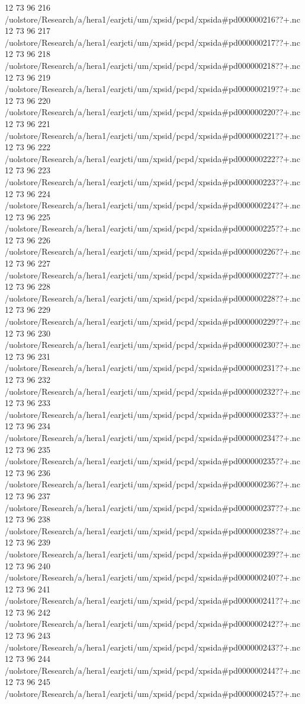 12 73 96
216
/uolstore/Research/a/hera1/earjcti/um/xpsid/pcpd/xpsida#pd000000216??+.nc
12 73 96
217
/uolstore/Research/a/hera1/earjcti/um/xpsid/pcpd/xpsida#pd000000217??+.nc
12 73 96
218
/uolstore/Research/a/hera1/earjcti/um/xpsid/pcpd/xpsida#pd000000218??+.nc
12 73 96
219
/uolstore/Research/a/hera1/earjcti/um/xpsid/pcpd/xpsida#pd000000219??+.nc
12 73 96
220
/uolstore/Research/a/hera1/earjcti/um/xpsid/pcpd/xpsida#pd000000220??+.nc
12 73 96
221
/uolstore/Research/a/hera1/earjcti/um/xpsid/pcpd/xpsida#pd000000221??+.nc
12 73 96
222
/uolstore/Research/a/hera1/earjcti/um/xpsid/pcpd/xpsida#pd000000222??+.nc
12 73 96
223
/uolstore/Research/a/hera1/earjcti/um/xpsid/pcpd/xpsida#pd000000223??+.nc
12 73 96
224
/uolstore/Research/a/hera1/earjcti/um/xpsid/pcpd/xpsida#pd000000224??+.nc
12 73 96
225
/uolstore/Research/a/hera1/earjcti/um/xpsid/pcpd/xpsida#pd000000225??+.nc
12 73 96
226
/uolstore/Research/a/hera1/earjcti/um/xpsid/pcpd/xpsida#pd000000226??+.nc
12 73 96
227
/uolstore/Research/a/hera1/earjcti/um/xpsid/pcpd/xpsida#pd000000227??+.nc
12 73 96
228
/uolstore/Research/a/hera1/earjcti/um/xpsid/pcpd/xpsida#pd000000228??+.nc
12 73 96
229
/uolstore/Research/a/hera1/earjcti/um/xpsid/pcpd/xpsida#pd000000229??+.nc
12 73 96
230
/uolstore/Research/a/hera1/earjcti/um/xpsid/pcpd/xpsida#pd000000230??+.nc
12 73 96
231
/uolstore/Research/a/hera1/earjcti/um/xpsid/pcpd/xpsida#pd000000231??+.nc
12 73 96
232
/uolstore/Research/a/hera1/earjcti/um/xpsid/pcpd/xpsida#pd000000232??+.nc
12 73 96
233
/uolstore/Research/a/hera1/earjcti/um/xpsid/pcpd/xpsida#pd000000233??+.nc
12 73 96
234
/uolstore/Research/a/hera1/earjcti/um/xpsid/pcpd/xpsida#pd000000234??+.nc
12 73 96
235
/uolstore/Research/a/hera1/earjcti/um/xpsid/pcpd/xpsida#pd000000235??+.nc
12 73 96
236
/uolstore/Research/a/hera1/earjcti/um/xpsid/pcpd/xpsida#pd000000236??+.nc
12 73 96
237
/uolstore/Research/a/hera1/earjcti/um/xpsid/pcpd/xpsida#pd000000237??+.nc
12 73 96
238
/uolstore/Research/a/hera1/earjcti/um/xpsid/pcpd/xpsida#pd000000238??+.nc
12 73 96
239
/uolstore/Research/a/hera1/earjcti/um/xpsid/pcpd/xpsida#pd000000239??+.nc
12 73 96
240
/uolstore/Research/a/hera1/earjcti/um/xpsid/pcpd/xpsida#pd000000240??+.nc
12 73 96
241
/uolstore/Research/a/hera1/earjcti/um/xpsid/pcpd/xpsida#pd000000241??+.nc
12 73 96
242
/uolstore/Research/a/hera1/earjcti/um/xpsid/pcpd/xpsida#pd000000242??+.nc
12 73 96
243
/uolstore/Research/a/hera1/earjcti/um/xpsid/pcpd/xpsida#pd000000243??+.nc
12 73 96
244
/uolstore/Research/a/hera1/earjcti/um/xpsid/pcpd/xpsida#pd000000244??+.nc
12 73 96
245
/uolstore/Research/a/hera1/earjcti/um/xpsid/pcpd/xpsida#pd000000245??+.nc

